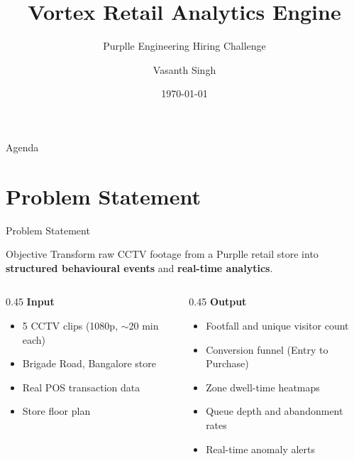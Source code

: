 \documentclass[aspectratio=169, 11pt]{beamer}
\title[Vortex Analytics]{Vortex Retail Analytics Engine}
\subtitle{Purplle Engineering Hiring Challenge}
\author{Vasanth Singh}
\date{\today}
\begin{document}
\begin{frame}
  \titlepage
\end{frame}

\begin{frame}{Agenda}
  \tableofcontents
\end{frame}

\section{Problem Statement}

\begin{frame}{Problem Statement}
  \begin{block}{Objective}
    Transform raw CCTV footage from a Purplle retail store into
    \textbf{structured behavioural events} and \textbf{real-time analytics}.
  \end{block}

  \vspace{0.4cm}

  \begin{columns}[T]
    \begin{column}{0.45\textwidth}
      \textbf{Input}
      \begin{itemize}
        \item 5 CCTV clips (1080p, $\sim$20 min each)
        \item Brigade Road, Bangalore store
        \item Real POS transaction data
        \item Store floor plan
      \end{itemize}
    \end{column}
    \begin{column}{0.45\textwidth}
      \textbf{Output}
      \begin{itemize}
        \item Footfall and unique visitor count
        \item Conversion funnel (Entry to Purchase)
        \item Zone dwell-time heatmaps
        \item Queue depth and abandonment rates
        \item Real-time anomaly alerts
      \end{itemize}
    \end{column}
  \end{columns}
\end{frame}
\end{document}
